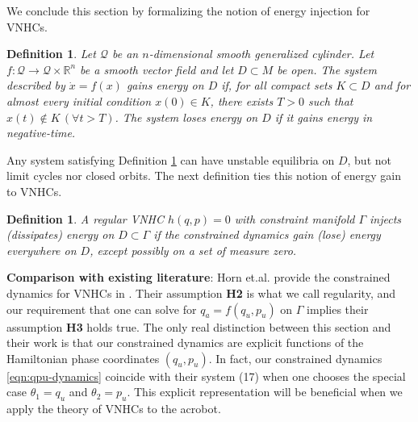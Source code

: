 \documentclass[journal,twoside,web]{ieeecolor}
\newtheorem{defn}[thm]{Definition} %
\newcommand*{\R}{\mathbb{R}}
\begin{document}
We conclude this section by formalizing the notion of energy injection for
VNHCs.

\begin{defn}\label{defn:energy-gain}
    Let \(\mathcal{Q}\) be an
    \(n\)-dimensional smooth generalized cylinder.
    Let \(f : \mathcal{Q} \rightarrow \mathcal{Q}\times\R^n\) be a smooth vector
    field and let \(D \subset M\) be open.
    The system described by \(\dot{x} = f(x)\) 
    \textit{gains energy on \(D\)} if, 
    for all compact sets \(K \subset D\) and for almost every initial
    condition \(x(0) \in K\), there exists \(T > 0\) such
    that \(x(t) \notin K \, (\forall t > T)\).
    The system \textit{loses energy on \(D\)} if it gains energy in
    negative-time.
\end{defn}

Any system satisfying Definition \ref{defn:energy-gain}
can have unstable equilibria on \(D\), but not limit cycles nor closed orbits.
The next definition ties this notion of energy gain to VNHCs.

\begin{defn}\label{defn:energy-injection}
    A regular VNHC \(h(q, p) = 0\) with constraint manifold \(\Gamma\)
    \textit{injects (dissipates) energy on \(D \subset \Gamma\)} if the
    constrained dynamics gain (lose) energy everywhere on \(D\), except possibly
    on a set of measure zero.
\end{defn}

\textbf{Comparison with existing literature}: Horn et.al. provide the constrained
dynamics for VNHCs in \cite{nhvc_incline_walking}.
Their assumption \textbf{H2} is what we call regularity, and our requirement
that one can solve for \(q_a = f(q_u,p_u)\) on \(\Gamma\) implies their
assumption \textbf{H3} holds true.
The only real distinction between this section and their work
is that our constrained dynamics are explicit functions of the Hamiltonian phase
coordinates \((q_u,p_u)\).
In fact, our constrained dynamics \eqref{eqn:qpu-dynamics} coincide with their
system (17) when one chooses the special case \(\theta_1 = q_u\) and 
\(\theta_2 = p_u\).
This explicit representation will be beneficial when we apply the theory of
VNHCs to the acrobot.

\end{document}
